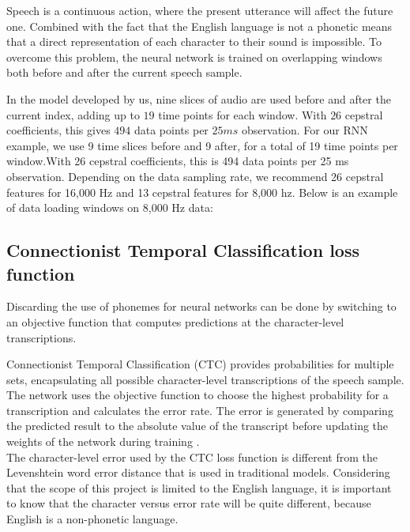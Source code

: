 Speech is a continuous action, where the present utterance will affect the future one. Combined with the fact that the English language is not a phonetic means that a direct
representation of each character to their sound is impossible. To overcome this problem, the neural network is trained on overlapping windows both before and after the current speech sample.

In the model developed by us, nine slices of audio are used before and after the current index, adding up to $19$ time points for each window. With $26$ cepstral coefficients, this gives $494$ data points per $25ms$ observation.
For our RNN example, we use 9 time slices before and 9 after, for a total of 19 time points per window.With 26 cepstral coefficients, this is 494 data points per 25 ms observation. Depending on the data sampling rate, we recommend 26 cepstral features for 16,000 Hz and 13 cepstral features for 8,000 hz. Below is an example of data loading windows on 8,000 Hz data:
 
\subsection{Connectionist Temporal Classification loss function}
 Discarding the use of phonemes for neural networks can be done by switching to an
 objective function that computes predictions at the character-level transcriptions.
 
 Connectionist Temporal Classification (CTC) provides probabilities for multiple sets, encapsulating all possible character-level transcriptions of the speech sample.
 The network uses the objective function to choose the highest probability for a transcription and calculates the error rate. The error is generated by comparing the 
 predicted result to the absolute value of the transcript before updating the weights
 of the network during training \cite{Great}. \\
 
The character-level error used by the CTC loss function is different from the Levenshtein \cite{stratonovich1960conditional} word error distance that is used in traditional models. Considering that the scope of this project is limited to the English language, it is important to know
that the character versus error rate will be quite different, because English is a
non-phonetic language.
